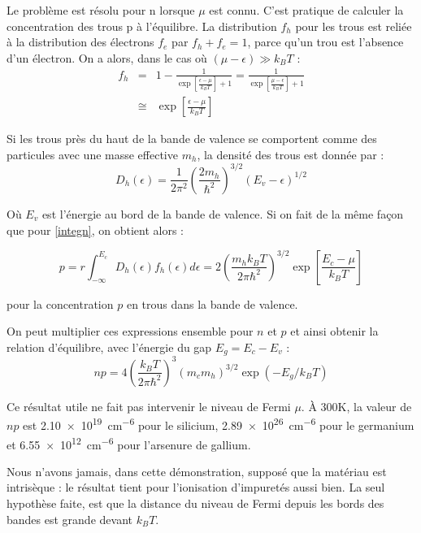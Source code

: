 Le problème est résolu pour n lorsque $\mu$ est connu. C'est pratique de calculer
la concentration des trous p à l'équilibre. La distribution $f_h$ pour les trous
est reliée à la distribution des électrons $f_e$ par $f_h + f_e = 1$, parce qu'un
trou est l'absence d'un électron. On a alors, dans le cas où $(\mu - \epsilon)
\gg k_BT$ :
\begin{align}
    f_h & = & 1 - \frac{1}{\exp\left[\frac{\epsilon - \mu}{k_BT}\right] + 1} =
    \frac{1}{\exp\left[\frac{\mu-\epsilon}{k_BT}\right] + 1}\\
    & \cong & \exp\left[\frac{\epsilon - \mu}{k_BT}\right]
    \label{fh}
\end{align}

Si les trous près du haut de la bande de valence se comportent comme des
particules avec une masse effective $m_h$, la densité des trous est donnée par :
\begin{equation}
    D_h(\epsilon) = \frac{1}{2\pi^2}\left( \frac{2m_h}{\hbar^2} \right)^{3/2}
    (E_v - \epsilon)^{1/2}
\end{equation}

Où $E_v$ est l'énergie au bord de la bande de valence. Si on fait de la même
façon que pour \ref{integn}, on obtient alors :

\begin{equation}
    p =r \int_{-\infty}^{E_c}D_h(\epsilon) f_h(\epsilon) d\epsilon = 2 \left(
    \frac{m_hk_BT}{2\pi\hbar^2} \right)^{3/2} \exp\left[ \frac{E_c - \mu}{k_BT}
    \right]
\end{equation}

pour la concentration $p$ en trous dans la bande de valence.

On peut multiplier ces expressions ensemble pour $n$ et $p$ et ainsi obtenir la
relation d'équilibre, avec l'énergie du gap $E_g = E_c - E_v$ :
\begin{equation}
    np = 4 \left( \frac{k_BT}{2\pi\hbar^2} \right)^3 (m_c m_h)^{3/2}
    \exp(-E_g/k_BT)
    \label{np}
\end{equation}

Ce résultat utile ne fait pas intervenir le niveau de Fermi $\mu$. À 300K, la
valeur de $np$ est \SI{2.10e19}{\centi\metre\tothe{-6}} pour le silicium,
\SI{2.89e26}{\centi\metre\tothe{-6}} pour le germanium et
\SI{6.55e12}{\centi\metre\tothe{-6}} pour l'arsenure de gallium.

Nous n'avons jamais, dans cette démonstration, supposé que la matériau est
intrisèque : le résultat tient pour l'ionisation d'impuretés aussi bien. La seul
hypothèse faite, est que la distance du niveau de Fermi depuis les bords des
bandes est grande devant $k_BT$.

